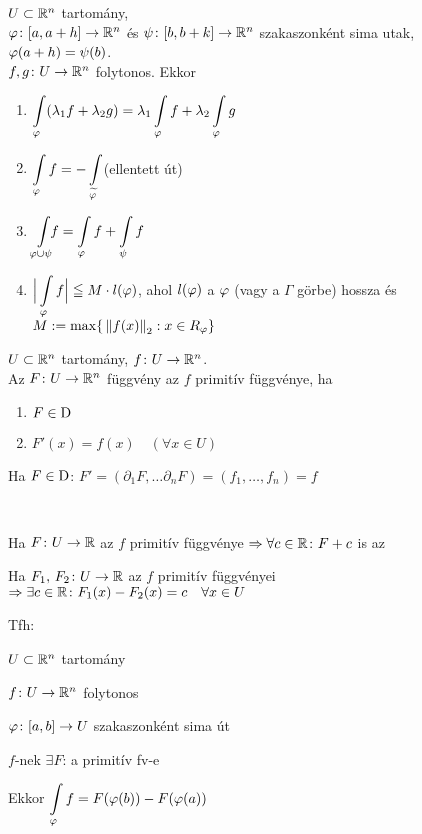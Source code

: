 \begin{te}
  $U\subset \mathbb{R}^n$ tartomány,\\$\varphi\colon [a,a+h]\to\mathbb{R}^n$ és $\psi\colon [b,b+k]\to\mathbb{R}^n$ szakaszonként sima utak,
  $\varphi(a+h) = \psi(b)$.\\$f,g\colon U\to\mathbb{R}^n$ folytonos. Ekkor
  \begin{enumerate}
  \item $\di\Int_\vfi(\lambda_1 f +\lambda_2g) = \lambda_1\Int_\vfi f+ \lambda_2\Int_\vfi g$
  \item $\di\Int_\vfi f = -\Int_{\widetilde{\vfi}}$\qquad (ellentett út)
  \item $\di\Int_{\vfi\cup\psi}\!\!\! f = \Int_\vfi f + \Int_\psi f$
  \item $\di\Big\vert \Int_\vfi f\Big\vert \leqq M\cdot l(\vfi)$, ahol $l(\varphi)$ a $\varphi$ (vagy a $\Gamma$ görbe)
  hossza és $M:= \max \{\,\left\Vert f(x)\right\Vert_2:x\in R_\varphi\}$
  \end{enumerate}
\end{te}

\begin{de}$U\subset\mathbb{R}^n$ tartomány, $f\colon U\to\mathbb{R}^n$.\\
  Az $F\colon U\to\mathbb{R}^n$ függvény az $f$ primitív függvénye, ha
  {\listazjromai
    \begin{enumerate}
    \item $F\in\operatorname{D}$
    \item $F'(x) = f(x)\quad (\forall x\in U)$
    \end{enumerate}
  }
\end{de}

\begin{megj}
  Ha $F\in\operatorname{D}$: $F'=(\partial_1F,\dotsc\partial_nF) =(f_1,\dotsc,f_n)=f$ 
\end{megj}

\begin{te}\ 
  \begin{enumzjromai}
  \item Ha $F\colon U\to\mathbb{R}$ az $f$ primitív függvénye $\Rightarrow \forall c\in\mathbb{R}\colon F+c$ is az
  \item Ha $F_1,\,F_2\colon U\to\mathbb{R}$ az $f$ primitív függvényei $\Rightarrow \exists c\in\mathbb{R}\colon F_1(x)-F_2(x) = c \quad \forall
  x\in U$
  \end{enumzjromai}
\end{te}
\begin{te}
  Tfh:
\begin{enumzjromai}
  \item $U\subset \mathbb{R}^n$ tartomány
  \item $f\colon U\to \mathbb{R}^n$ folytonos
  \item $\varphi\colon [a,b]\to U$ szakaszonként sima út
  \item $f$-nek $\exists F$: a primitív fv-e
\end{enumzjromai}
Ekkor $\di\Int_\vfi f = F(\vfi(b))-F(\vfi(a))$
\end{te}

